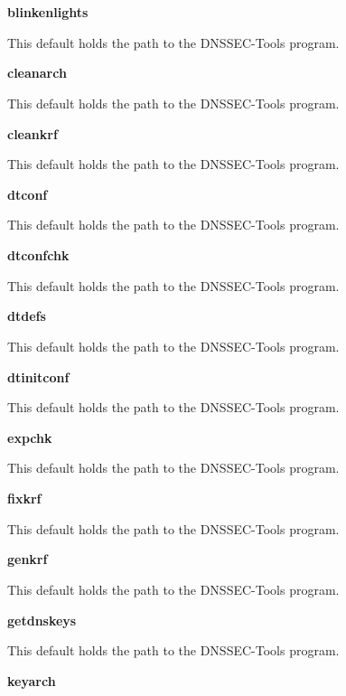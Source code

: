 \begin{description}

\item {\bf blinkenlights}\verb" "

This default holds the path to the DNSSEC-Tools  program.

\item {\bf cleanarch}\verb" "

This default holds the path to the DNSSEC-Tools  program.

\item {\bf cleankrf}\verb" "

This default holds the path to the DNSSEC-Tools  program.

\item {\bf dtconf}\verb" "

This default holds the path to the DNSSEC-Tools  program.

\item {\bf dtconfchk}\verb" "

This default holds the path to the DNSSEC-Tools  program.

\item {\bf dtdefs}\verb" "

This default holds the path to the DNSSEC-Tools  program.

\item {\bf dtinitconf}\verb" "

This default holds the path to the DNSSEC-Tools  program.

\item {\bf expchk}\verb" "

This default holds the path to the DNSSEC-Tools  program.

\item {\bf fixkrf}\verb" "

This default holds the path to the DNSSEC-Tools  program.

\item {\bf genkrf}\verb" "

This default holds the path to the DNSSEC-Tools  program.

\item {\bf getdnskeys}\verb" "

This default holds the path to the DNSSEC-Tools  program.

\item {\bf keyarch}\verb" "


\end{description}
